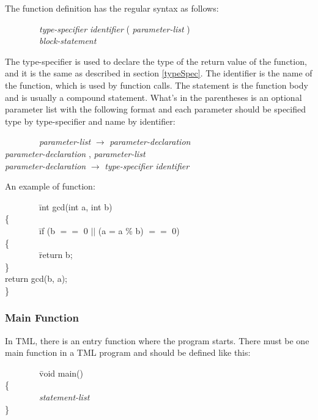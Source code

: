 \documentclass[12pt,psfig,a4]{article}
\begin{document}
The function definition has the regular syntax as follows:
\begin{code}
\begin{tabbing}
~~~~~~~~\= \textsl{type-specifier} \textsl{identifier} ( \textsl{parameter-list} ) \\
\> ~~~~~~~~\textsl{block-statement}
\end{tabbing}
\end{code}

The type-specifier is used to declare the type of the return value of the function, and it is the same as described in section \ref{typeSpec}. The identifier is the name of the function, which is used by function calls. The statement is the function body and is usually a compound statement. What's in the parentheses is an optional parameter list with the following format and each parameter should be specified type by type-specifier and name by identifier:
\begin{code}
\begin{tabbing}
~~~~~~~~\= \textsl{parameter-list} $\rightarrow$ \= \textsl{parameter-declaration} \\
\> \> \textsl{parameter-declaration} , \textsl{parameter-list} \\
\> \textsl{parameter-declaration} $\rightarrow$ \textsl{type-specifier} \textsl{identifier}
\end{tabbing}
\end{code}

An example of function:
\begin{code}
\begin{tabbing}
~~~~~~~~\= int gcd(int a, int b) \\
\> \{ \\
\> ~~~~~~~~\= if (b $==$ 0 $||$ (a = a \% b) $==$ 0) \\
\> \> \{ \\
\> \> ~~~~~~~~\= return b; \\
\> \> \} \\
\> \> return gcd(b, a); \\
\> \}
\end{tabbing}
\end{code}

\subsubsection{Main Function}
In TML, there is an entry function where the program starts. There must be one main function in a TML program and should be defined like this:
\begin{code}
\begin{tabbing}
~~~~~~~~\= void main() \\
\> \{ \\
\> ~~~~~~~~\textsl{statement-list} \\
\> \} 
\end{tabbing}
\end{code}
\end{document}

